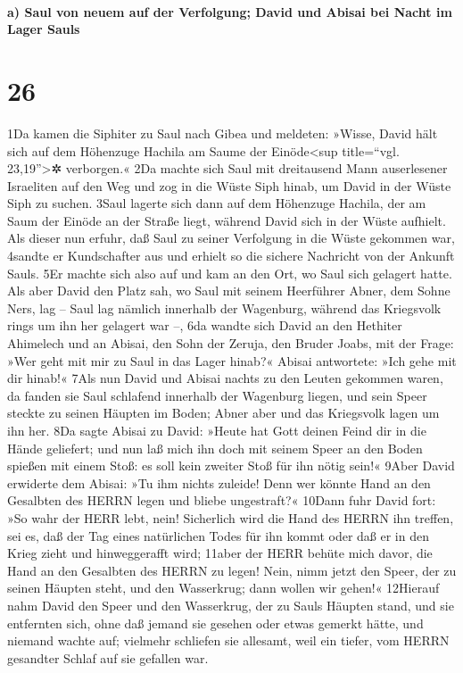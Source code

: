 \hypertarget{a-saul-von-neuem-auf-der-verfolgung-david-und-abisai-bei-nacht-im-lager-sauls}{%
\paragraph{a) Saul von neuem auf der Verfolgung; David und Abisai bei
Nacht im Lager
Sauls}\label{a-saul-von-neuem-auf-der-verfolgung-david-und-abisai-bei-nacht-im-lager-sauls}}

\hypertarget{section-25}{%
\section{26}\label{section-25}}

1Da kamen die Siphiter zu Saul nach Gibea und meldeten: »Wisse, David
hält sich auf dem Höhenzuge Hachila am Saume der Einöde\textless sup
title=``vgl. 23,19''\textgreater✲ verborgen.« 2Da machte sich Saul mit
dreitausend Mann auserlesener Israeliten auf den Weg und zog in die
Wüste Siph hinab, um David in der Wüste Siph zu suchen. 3Saul lagerte
sich dann auf dem Höhenzuge Hachila, der am Saum der Einöde an der
Straße liegt, während David sich in der Wüste aufhielt. Als dieser nun
erfuhr, daß Saul zu seiner Verfolgung in die Wüste gekommen war, 4sandte
er Kundschafter aus und erhielt so die sichere Nachricht von der Ankunft
Sauls. 5Er machte sich also auf und kam an den Ort, wo Saul sich
gelagert hatte. Als aber David den Platz sah, wo Saul mit seinem
Heerführer Abner, dem Sohne Ners, lag -- Saul lag nämlich innerhalb der
Wagenburg, während das Kriegsvolk rings um ihn her gelagert war --, 6da
wandte sich David an den Hethiter Ahimelech und an Abisai, den Sohn der
Zeruja, den Bruder Joabs, mit der Frage: »Wer geht mit mir zu Saul in
das Lager hinab?« Abisai antwortete: »Ich gehe mit dir hinab!« 7Als nun
David und Abisai nachts zu den Leuten gekommen waren, da fanden sie Saul
schlafend innerhalb der Wagenburg liegen, und sein Speer steckte zu
seinen Häupten im Boden; Abner aber und das Kriegsvolk lagen um ihn her.
8Da sagte Abisai zu David: »Heute hat Gott deinen Feind dir in die Hände
geliefert; und nun laß mich ihn doch mit seinem Speer an den Boden
spießen mit einem Stoß: es soll kein zweiter Stoß für ihn nötig sein!«
9Aber David erwiderte dem Abisai: »Tu ihm nichts zuleide! Denn wer
könnte Hand an den Gesalbten des HERRN legen und bliebe ungestraft?«
10Dann fuhr David fort: »So wahr der HERR lebt, nein! Sicherlich wird
die Hand des HERRN ihn treffen, sei es, daß der Tag eines natürlichen
Todes für ihn kommt oder daß er in den Krieg zieht und hinweggerafft
wird; 11aber der HERR behüte mich davor, die Hand an den Gesalbten des
HERRN zu legen! Nein, nimm jetzt den Speer, der zu seinen Häupten steht,
und den Wasserkrug; dann wollen wir gehen!« 12Hierauf nahm David den
Speer und den Wasserkrug, der zu Sauls Häupten stand, und sie entfernten
sich, ohne daß jemand sie gesehen oder etwas gemerkt hätte, und niemand
wachte auf; vielmehr schliefen sie allesamt, weil ein tiefer, vom HERRN
gesandter Schlaf auf sie gefallen war.

